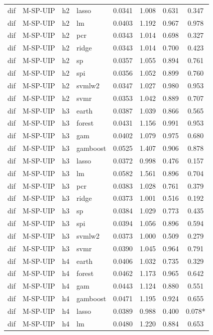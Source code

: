 \begin{ThreePartTable}
\begin{longtable}[t]{llclcccc}
dif & M-SP-UIP & h2 & lasso & 0.0341 & 1.008 & 0.631 & 0.347\\
dif & M-SP-UIP & h2 & lm & 0.0403 & 1.192 & 0.967 & 0.978\\
dif & M-SP-UIP & h2 & pcr & 0.0343 & 1.014 & 0.698 & 0.327\\
dif & M-SP-UIP & h2 & ridge & 0.0343 & 1.014 & 0.700 & 0.423\\
dif & M-SP-UIP & h2 & sp & 0.0357 & 1.055 & 0.894 & 0.761\\
dif & M-SP-UIP & h2 & spi & 0.0356 & 1.052 & 0.899 & 0.760\\
dif & M-SP-UIP & h2 & svmlw2 & 0.0347 & 1.027 & 0.980 & 0.953\\
dif & M-SP-UIP & h2 & svmr & 0.0353 & 1.042 & 0.889 & 0.707\\
\addlinespace
dif & M-SP-UIP & h3 & earth & 0.0387 & 1.039 & 0.866 & 0.565\\
dif & M-SP-UIP & h3 & forest & 0.0431 & 1.156 & 0.991 & 0.953\\
dif & M-SP-UIP & h3 & gam & 0.0402 & 1.079 & 0.975 & 0.680\\
dif & M-SP-UIP & h3 & gamboost & 0.0525 & 1.407 & 0.906 & 0.878\\
dif & M-SP-UIP & h3 & lasso & 0.0372 & 0.998 & 0.476 & 0.157\\
dif & M-SP-UIP & h3 & lm & 0.0582 & 1.561 & 0.896 & 0.704\\
dif & M-SP-UIP & h3 & pcr & 0.0383 & 1.028 & 0.761 & 0.379\\
dif & M-SP-UIP & h3 & ridge & 0.0373 & 1.001 & 0.516 & 0.192\\
dif & M-SP-UIP & h3 & sp & 0.0384 & 1.029 & 0.773 & 0.435\\
dif & M-SP-UIP & h3 & spi & 0.0394 & 1.056 & 0.896 & 0.594\\
dif & M-SP-UIP & h3 & svmlw2 & 0.0373 & 1.000 & 0.509 & 0.279\\
dif & M-SP-UIP & h3 & svmr & 0.0390 & 1.045 & 0.964 & 0.791\\
\addlinespace
dif & M-SP-UIP & h4 & earth & 0.0406 & 1.032 & 0.735 & 0.329\\
dif & M-SP-UIP & h4 & forest & 0.0462 & 1.173 & 0.965 & 0.642\\
dif & M-SP-UIP & h4 & gam & 0.0443 & 1.124 & 0.880 & 0.551\\
dif & M-SP-UIP & h4 & gamboost & 0.0471 & 1.195 & 0.924 & 0.655\\
dif & M-SP-UIP & h4 & lasso & 0.0389 & 0.988 & 0.400 & 0.078*\\
dif & M-SP-UIP & h4 & lm & 0.0480 & 1.220 & 0.884 & 0.653\\

\end{longtable}
\end{ThreePartTable}
